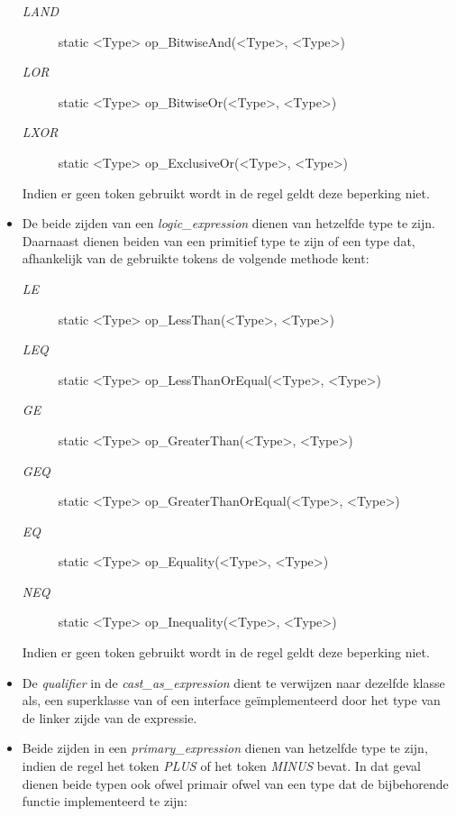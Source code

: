 \begin{itemize}
	\begin{description}
		\item[\textit{LAND}] static \textless{}Type\textgreater{} op\_BitwiseAnd(\textless{}Type\textgreater{}, \textless{}Type\textgreater{})
		\item[\textit{LOR}] static \textless{}Type\textgreater{} op\_BitwiseOr(\textless{}Type\textgreater{}, \textless{}Type\textgreater{})
		\item[\textit{LXOR}] static \textless{}Type\textgreater{} op\_ExclusiveOr(\textless{}Type\textgreater{}, \textless{}Type\textgreater{})
	\end{description}
	Indien er geen token gebruikt wordt in de regel geldt deze beperking niet.
	\item De beide zijden van een \textit{logic\_expression} dienen van hetzelfde type te zijn. Daarnaast dienen beiden van een primitief type te zijn of een type dat, afhankelijk van de gebruikte tokens de volgende methode kent:
	\begin{description}
		\item[\textit{LE}] static \textless{}Type\textgreater{} op\_LessThan(\textless{}Type\textgreater{}, \textless{}Type\textgreater{})
		\item[\textit{LEQ}] static \textless{}Type\textgreater{} op\_LessThanOrEqual(\textless{}Type\textgreater{}, \textless{}Type\textgreater{})
		\item[\textit{GE}] static \textless{}Type\textgreater{} op\_GreaterThan(\textless{}Type\textgreater{}, \textless{}Type\textgreater{})
		\item[\textit{GEQ}] static \textless{}Type\textgreater{} op\_GreaterThanOrEqual(\textless{}Type\textgreater{}, \textless{}Type\textgreater{})
		\item[\textit{EQ}] static \textless{}Type\textgreater{} op\_Equality(\textless{}Type\textgreater{}, \textless{}Type\textgreater{})
		\item[\textit{NEQ}] static \textless{}Type\textgreater{} op\_Inequality(\textless{}Type\textgreater{}, \textless{}Type\textgreater{})
	\end{description}
	Indien er geen token gebruikt wordt in de regel geldt deze beperking niet.
	\item De \textit{qualifier} in de \textit{cast\_as\_expression} dient te verwijzen naar dezelfde klasse als, een superklasse van of een interface ge\"implementeerd door het type van de linker zijde van de expressie.
	\item Beide zijden in een \textit{primary\_expression} dienen van hetzelfde type te zijn, indien de regel het token \textit{PLUS} of het token \textit{MINUS} bevat. In dat geval dienen beide typen ook ofwel primair ofwel van een type dat de bijbehorende functie implementeerd te zijn:

\end{itemize}
